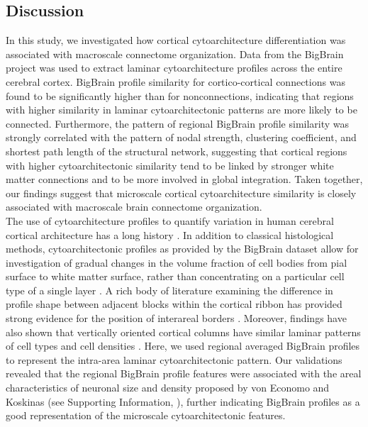 \begin{refsection}
\section*{Discussion}
In this study, we investigated how cortical cytoarchitecture differentiation was associated with macroscale connectome organization. Data from the BigBrain project was used to extract laminar cytoarchitecture profiles across the entire cerebral cortex. BigBrain profile similarity for cortico-cortical connections was found to be significantly higher than for nonconnections, indicating that regions with higher similarity in laminar cytoarchitectonic patterns are more likely to be connected. Furthermore, the pattern of regional BigBrain profile similarity was strongly correlated with the pattern of nodal strength, clustering coefficient, and shortest path length of the structural network, suggesting that cortical regions with higher cytoarchitectonic similarity tend to be linked by stronger white matter connections and to be more involved in global integration. Taken together, our findings suggest that microscale cortical cytoarchitecture similarity is closely associated with macroscale brain connectome organization.\\

The use of cytoarchitecture profiles to quantify variation in human cerebral cortical architecture has a long history \citep{HAUG1956,MACKEY20091089,SCHLEICHER1986221,Schleicher2009,WREE198229}. In addition to classical histological methods, cytoarchitectonic profiles as provided by the BigBrain dataset allow for investigation of gradual changes in the volume fraction of cell bodies from pial surface to white matter surface, rather than concentrating on a particular cell type of a single layer \citep{Amunts2015ArchitectonicMO}. A rich body of literature examining the difference in profile shape between adjacent blocks within the cortical ribbon has provided strong evidence for the position of interareal borders \citep{Caspers2012CytoarchitectonicalAA,Schleicher2009,Schleicher1999ObserverIndependentMF,Schleicher2000ASA,Kujovic2012CytoarchitectonicMO}. Moreover, findings have also shown that vertically oriented cortical columns have similar laminar patterns of cell types and cell densities \citep{Zilles2010CentenaryOB}. Here, we used regional averaged BigBrain profiles to represent the intra-area laminar cytoarchitectonic pattern. Our validations revealed that the regional BigBrain profile features were associated with the areal characteristics of neuronal size and density proposed by von Economo and Koskinas (see Supporting Information, \citet{WEI2019bigbrain}), further indicating BigBrain profiles as a good representation of the microscale cytoarchitectonic features.\\


\end{refsection}
